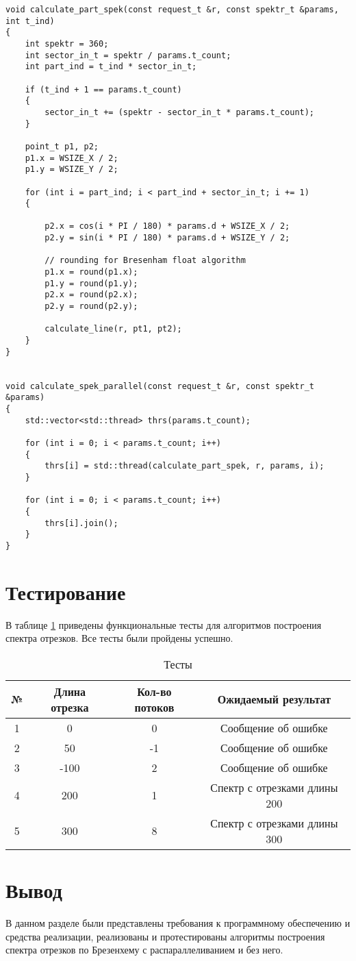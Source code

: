 \begin{lstlisting}[caption=Функция алгоритма построения спектра отрезков по Брезенехему (с многопоточностью),
	label={par}]
void calculate_part_spek(const request_t &r, const spektr_t &params, int t_ind)
{
    int spektr = 360;
    int sector_in_t = spektr / params.t_count;
    int part_ind = t_ind * sector_in_t;

    if (t_ind + 1 == params.t_count)
    {
        sector_in_t += (spektr - sector_in_t * params.t_count);
    }

    point_t p1, p2;
    p1.x = WSIZE_X / 2;
    p1.y = WSIZE_Y / 2;

    for (int i = part_ind; i < part_ind + sector_in_t; i += 1)
    {

        p2.x = cos(i * PI / 180) * params.d + WSIZE_X / 2;
        p2.y = sin(i * PI / 180) * params.d + WSIZE_Y / 2;

        // rounding for Bresenham float algorithm
        p1.x = round(p1.x);
        p1.y = round(p1.y);
        p2.x = round(p2.x);
        p2.y = round(p2.y);

        calculate_line(r, pt1, pt2);
    }
}


void calculate_spek_parallel(const request_t &r, const spektr_t &params)
{
    std::vector<std::thread> thrs(params.t_count);

    for (int i = 0; i < params.t_count; i++)
    {
        thrs[i] = std::thread(calculate_part_spek, r, params, i);
    }

    for (int i = 0; i < params.t_count; i++)
    {
        thrs[i].join();
    }
}
\end{lstlisting}

\section{Тестирование}

В таблице \ref{test} приведены функциональные тесты для алгоритмов построения спектра отрезков. Все тесты были пройдены успешно.


\begin{table}[h]
	\begin{center}
		\caption{\label{test} Тесты}
		\begin{tabular}{|c|c|c|c|}
			\hline
			№ & Длина отрезка & Кол-во потоков & Ожидаемый результат \\
			\hline
            1 & 0 & 0 & Сообщение об ошибке \\
            \hline
            2 & 50 & -1 & Сообщение об ошибке \\
            \hline
            3 & -100 & 2 & Сообщение об ошибке \\
            \hline
            4 & 200 & 1 &  Спектр с отрезками длины 200 \\
			\hline
			5 & 300 & 8 & Спектр с отрезками длины 300 \\
			\hline
		\end{tabular}
	\end{center}
\end{table}

\section*{Вывод}

В данном разделе были представлены требования к программному обеспечению и средства реализации, реализованы и протестированы алгоритмы построения спектра отрезков по Брезенхему с распараллеливанием и без него.


